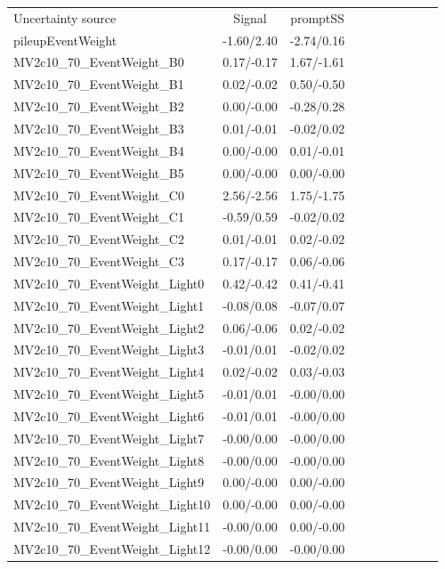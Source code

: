 \begin{table}[h]
\scriptsize
\begin{center}
\begin{tabular}{l|ccccccccc}
\hline
\hline
Uncertainty source &Signal &promptSS \\
pileupEventWeight &-1.60/2.40 &-2.74/0.16 \\
MV2c10\_70\_EventWeight\_B0 &0.17/-0.17 &1.67/-1.61 \\
MV2c10\_70\_EventWeight\_B1 &0.02/-0.02 &0.50/-0.50 \\
MV2c10\_70\_EventWeight\_B2 &0.00/-0.00 &-0.28/0.28 \\
MV2c10\_70\_EventWeight\_B3 &0.01/-0.01 &-0.02/0.02 \\
MV2c10\_70\_EventWeight\_B4 &0.00/-0.00 &0.01/-0.01 \\
MV2c10\_70\_EventWeight\_B5 &0.00/-0.00 &0.00/-0.00 \\
MV2c10\_70\_EventWeight\_C0 &2.56/-2.56 &1.75/-1.75 \\
MV2c10\_70\_EventWeight\_C1 &-0.59/0.59 &-0.02/0.02 \\
MV2c10\_70\_EventWeight\_C2 &0.01/-0.01 &0.02/-0.02 \\
MV2c10\_70\_EventWeight\_C3 &0.17/-0.17 &0.06/-0.06 \\
MV2c10\_70\_EventWeight\_Light0 &0.42/-0.42 &0.41/-0.41 \\
MV2c10\_70\_EventWeight\_Light1 &-0.08/0.08 &-0.07/0.07 \\
MV2c10\_70\_EventWeight\_Light2 &0.06/-0.06 &0.02/-0.02 \\
MV2c10\_70\_EventWeight\_Light3 &-0.01/0.01 &-0.02/0.02 \\
MV2c10\_70\_EventWeight\_Light4 &0.02/-0.02 &0.03/-0.03 \\
MV2c10\_70\_EventWeight\_Light5 &-0.01/0.01 &-0.00/0.00 \\
MV2c10\_70\_EventWeight\_Light6 &-0.01/0.01 &-0.00/0.00 \\
MV2c10\_70\_EventWeight\_Light7 &-0.00/0.00 &-0.00/0.00 \\
MV2c10\_70\_EventWeight\_Light8 &-0.00/0.00 &-0.00/0.00 \\
MV2c10\_70\_EventWeight\_Light9 &0.00/-0.00 &0.00/-0.00 \\
MV2c10\_70\_EventWeight\_Light10 &0.00/-0.00 &0.00/-0.00 \\
MV2c10\_70\_EventWeight\_Light11 &-0.00/0.00 &0.00/-0.00 \\
MV2c10\_70\_EventWeight\_Light12 &-0.00/0.00 &-0.00/0.00 \\

\end{tabular}
\end{center}
\end{table}

